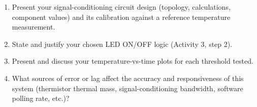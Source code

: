 \begin{reportq}
  \begin{enumerate}
    \item Present your signal-conditioning circuit design (topology, calculations, component values) and its calibration against a reference temperature measurement.
    \item State and justify your chosen LED ON/OFF logic (Activity 3, step 2).
    \item Present and discuss your temperature-vs-time plots for each threshold tested.
    \item What sources of error or lag affect the accuracy and responsiveness of this system (thermistor thermal mass, signal-conditioning bandwidth, software polling rate, etc.)?
  \end{enumerate}
\end{reportq}
